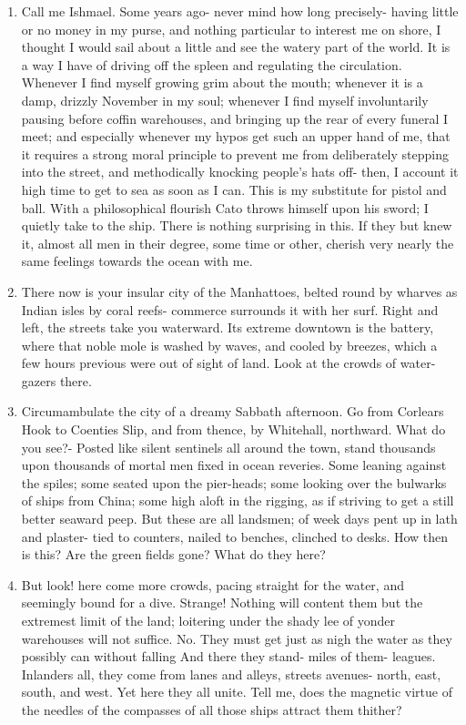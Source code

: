 \documentclass{../armymemo}
\begin{document}
\begin{enumerate}
  \begin{enumerate}
  \item Call me Ishmael. Some years ago- never mind how long precisely- having little or
    no money in my purse, and nothing particular to interest me on shore, I thought
    I would sail about a little and see the watery part of the world. It is a way I
    have of driving off the spleen and regulating the circulation. Whenever I find
    myself growing grim about the mouth; whenever it is a damp, drizzly November in
    my soul; whenever I find myself involuntarily pausing before coffin warehouses,
    and bringing up the rear of every funeral I meet; and especially whenever my
    hypos get such an upper hand of me, that it requires a strong moral principle to
    prevent me from deliberately stepping into the street, and methodically knocking
    people's hats off- then, I account it high time to get to sea as soon as I can.
    This is my substitute for pistol and ball. With a philosophical flourish Cato
    throws himself upon his sword; I quietly take to the ship. There is nothing
    surprising in this. If they but knew it, almost all men in their degree, some
    time or other, cherish very nearly the same feelings towards the ocean with me.

  \item There now is your insular city of the Manhattoes, belted round by wharves as
    Indian isles by coral reefs- commerce surrounds it with her surf. Right and
    left, the streets take you waterward. Its extreme downtown is the battery, where
    that noble mole is washed by waves, and cooled by breezes, which a few hours
    previous were out of sight of land. Look at the crowds of water-gazers there.

  \item Circumambulate the city of a dreamy Sabbath afternoon. Go from Corlears Hook to
    Coenties Slip, and from thence, by Whitehall, northward. What do you see?-
    Posted like silent sentinels all around the town, stand thousands upon thousands
    of mortal men fixed in ocean reveries. Some leaning against the spiles; some
    seated upon the pier-heads; some looking over the bulwarks of ships from China;
    some high aloft in the rigging, as if striving to get a still better seaward
    peep. But these are all landsmen; of week days pent up in lath and plaster- tied
    to counters, nailed to benches, clinched to desks. How then is this? Are the
    green fields gone? What do they here?

  \item But look! here come more crowds, pacing straight for the water, and seemingly
    bound for a dive. Strange! Nothing will content them but the extremest limit of
    the land; loitering under the shady lee of yonder warehouses will not suffice.
    No. They must get just as nigh the water as they possibly can without falling
    And there they stand- miles of them- leagues. Inlanders all, they come from
    lanes and alleys, streets avenues- north, east, south, and west. Yet here they
    all unite. Tell me, does the magnetic virtue of the needles of the compasses of
    all those ships attract them thither?


\end{enumerate}
\end{enumerate}
\end{document}
